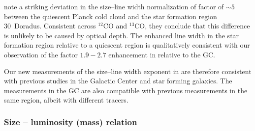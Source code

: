 \citet{Wong:2017hx} note a striking deviation in the size--line width normalization of factor of $\sim 5$ between the quiescent Planck cold cloud and the star formation region 30~Doradus. Consistent across $^{12}$CO and $^{13}$CO, they conclude that this difference is unlikely to be caused by optical depth. The enhanced line width in the star formation region relative to a quiescent region is qualitatively consistent with our observation of the factor $1.9-2.7$ enhancement in  relative to the GC.

Our new measurements of the size--line width exponent in  are therefore consistent with previous studies in the Galactic Center and star forming galaxies. The measurements in the GC are also compatible with previous measurements in the same region, albeit with different tracers.



\subsubsection{Size -- luminosity (mass) relation}
\label{dendro: section: literature: size mass}


